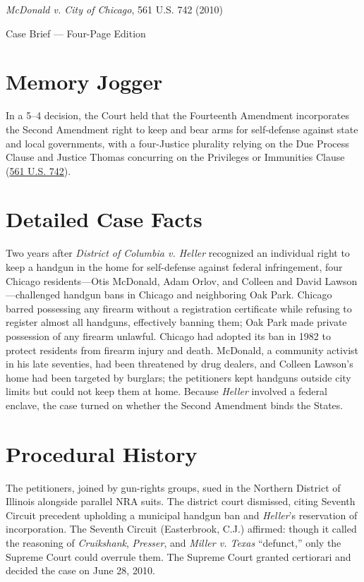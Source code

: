 \documentclass[12pt]{article}
\begin{document}
\begin{center}
{\LARGE \textit{McDonald v. City of Chicago}, 561 U.S. 742 (2010)\par}
\vspace{0.8em}
{\large Case Brief --- Four-Page Edition\par}
\end{center}
\vspace{1em}

\section{Memory Jogger}

In a 5--4 decision, the Court held that the Fourteenth Amendment incorporates the Second Amendment right to keep and bear arms for self-defense against state and local governments, with a four-Justice plurality relying on the Due Process Clause and Justice Thomas concurring on the Privileges or Immunities Clause (\href{https://www.courtlistener.com/opinion/149702/mcdonald-v-city-of-chicago/}{561 U.S. 742}).

\section{Detailed Case Facts}

Two years after \textit{District of Columbia v. Heller} recognized an individual right to keep a handgun in the home for self-defense against federal infringement, four Chicago residents---Otis McDonald, Adam Orlov, and Colleen and David Lawson---challenged handgun bans in Chicago and neighboring Oak Park. Chicago barred possessing any firearm without a registration certificate while refusing to register almost all handguns, effectively banning them; Oak Park made private possession of any firearm unlawful. Chicago had adopted its ban in 1982 to protect residents from firearm injury and death. McDonald, a community activist in his late seventies, had been threatened by drug dealers, and Colleen Lawson's home had been targeted by burglars; the petitioners kept handguns outside city limits but could not keep them at home. Because \textit{Heller} involved a federal enclave, the case turned on whether the Second Amendment binds the States.

\section{Procedural History}

The petitioners, joined by gun-rights groups, sued in the Northern District of Illinois alongside parallel NRA suits. The district court dismissed, citing Seventh Circuit precedent upholding a municipal handgun ban and \textit{Heller}'s reservation of incorporation. The Seventh Circuit (Easterbrook, C.J.) affirmed: though it called the reasoning of \textit{Cruikshank}, \textit{Presser}, and \textit{Miller v. Texas} ``defunct,'' only the Supreme Court could overrule them. The Supreme Court granted certiorari and decided the case on June 28, 2010.
\end{document}
